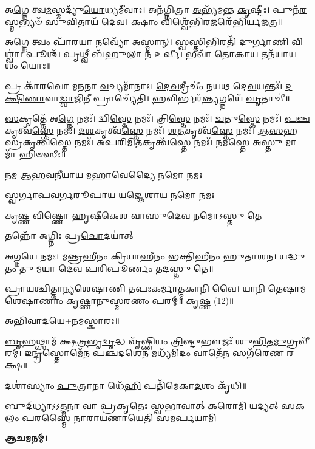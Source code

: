 𑌅\-\ul{𑌗𑍍𑌨𑍇} 𑌤𑍍𑌵\-\ul{𑌮}\-𑌸𑍍𑌮𑌦𑍍𑌯𑍁᳴\-\ul{𑌯𑍋}\-𑌧𑍍𑌯𑌮𑍀᳴𑌵𑌾𑌃। 𑌅𑌨᳴𑌗𑍍𑌨𑌿𑌤𑍍𑌰𑌾 \ul{𑌅}\-𑌭𑍍𑌯᳴𑌮𑌨𑍍𑌤 \ul{𑌕𑍃}\-𑌷𑍍𑌟𑍀𑌃।
𑌪𑍁𑌨᳴\-\ul{𑌰}\-𑌸𑍍𑌮𑌭𑍍𑌯𑍞᳴ 𑌸𑍁\-\ul{𑌵𑌿}\-𑌤𑌾𑌯᳴ 𑌦𑍇𑌵। 𑌕𑍍𑌷𑌾𑌂 𑌵𑌿𑌶𑍍𑌵𑍇᳴𑌭𑌿\-\ul{𑌰}\-𑌜𑌰𑍇᳴𑌭𑌿𑌰𑍍𑌯𑌜𑌤𑍍𑌰॥ 

𑌅\-\ul{𑌗𑍍𑌨𑍇} 𑌤𑍍𑌵𑌂 𑌪𑌾᳴𑌰\-\ul{𑌯𑌾} 𑌨𑌵𑍍𑌯𑍋᳴ \ul{𑌅}\-𑌸𑍍𑌮𑌾𑌨𑍍। \ul{𑌸𑍍𑌵}\-𑌸𑍍𑌤𑌿\-\ul{𑌭𑌿}\-𑌰𑌤𑌿᳴ \ul{𑌦𑍁}\-𑌰𑍍𑌗𑌾\-\ul{𑌣𑌿} 𑌵𑌿𑌶𑍍𑌵𑌾॑।
𑌪𑍂𑌶𑍍𑌚᳴ \ul{𑌪𑍃}\-𑌥𑍍𑌵𑍀 𑌬᳴\-\ul{𑌹𑍁}\-𑌲𑌾 𑌨᳴ \ul{𑌉}\-𑌰𑍍𑌵𑍀। 𑌭𑌵𑌾᳴ \ul{𑌤𑍋}\-𑌕𑌾\-\ul{𑌯} 𑌤𑌨᳴𑌯𑌾\-\ul{𑌯} 𑌶𑌂 𑌯𑍋𑌃॥

𑌪𑍍𑌰 𑌕𑌾᳴𑌰𑌵𑍋 𑌮\-\ul{𑌨}\-𑌨𑌾 \ul{𑌵}\-𑌚𑍍𑌯𑌮𑌾᳴𑌨𑌾𑌃। \ul{𑌦𑍇}\-\-\ul{𑌵}\-𑌦𑍍𑌰𑍀𑌚𑍀𑌂॑ 𑌨𑌯𑌥 𑌦𑍇\-\ul{𑌵}\-𑌯𑌨𑍍𑌤𑌃᳴।
\-\ul{𑌦}\-\-\ul{𑌕𑍍𑌷𑌿}\-\-\ul{𑌣𑌾}\-𑌵𑌾\-\ul{𑌡𑍍𑌵𑌾}\-𑌜𑌿\-\ul{𑌨𑍀} 𑌪𑍍𑌰𑌾𑌚𑍍𑌯𑍇᳴𑌤𑌿। \ul{𑌹}\-𑌵𑌿𑌰𑍍𑌭𑌰᳴\-\ul{𑌨𑍍𑌤𑍍𑌯}\-𑌗𑍍𑌨𑌯𑍇᳴ \ul{𑌘𑍃}\-𑌤𑌾𑌚𑍀॑॥

\-\ul{𑌸}\-𑌕𑍃𑌤𑍍𑌤𑍇᳴ 𑌅\-\ul{𑌗𑍍𑌨𑍇} 𑌨𑌮𑌃᳴। 𑌦𑍍𑌵𑌿\-\ul{𑌸𑍍𑌤𑍇} 𑌨𑌮𑌃᳴। 𑌤𑍍𑌰𑌿\-\ul{𑌸𑍍𑌤𑍇} 𑌨𑌮𑌃᳴। \ul{𑌚}\-𑌤𑍁\-\ul{𑌸𑍍𑌤𑍇} 𑌨𑌮𑌃᳴। \ul{𑌪}\-\-\ul{𑌞𑍍𑌚}\-𑌕𑍃𑌤𑍍𑌵᳴\-\ul{𑌸𑍍𑌤𑍇} 𑌨𑌮𑌃᳴। \ul{𑌦}\-\-\ul{𑌶}\-𑌕𑍃𑌤𑍍𑌵᳴\-\ul{𑌸𑍍𑌤𑍇} 𑌨𑌮𑌃᳴। \ul{𑌶}\-\-\ul{𑌤}\-𑌕𑍃𑌤𑍍𑌵᳴\-\ul{𑌸𑍍𑌤𑍇} 𑌨𑌮𑌃᳴। \ul{𑌆}\-\-\ul{𑌸}\-\-\ul{𑌹}\-\-\ul{𑌸𑍍𑌰}\-𑌕𑍃𑌤𑍍𑌵᳴\-\ul{𑌸𑍍𑌤𑍇} 𑌨𑌮𑌃᳴। \ul{𑌅}\-\-\ul{𑌪}\-\-\ul{𑌰𑌿}\-\-\ul{𑌮𑌿}\-\-\ul{𑌤}\-𑌕𑍃𑌤𑍍𑌵᳴\-\ul{𑌸𑍍𑌤𑍇} 𑌨𑌮𑌃᳴। 𑌨𑌮᳴𑌸𑍍𑌤𑍇 𑌅\-\ul{𑌸𑍍𑌤𑍁} 𑌮𑌾 𑌮𑌾᳴ 𑌹𑌿𑍞𑌸𑍀𑌃॥

{𑌨𑌮 𑌆𑌹𑌵𑌨𑍀𑌯𑌾𑌯 𑌮𑌹𑌾𑌵𑍇𑌦𑍍𑌯𑍈 𑌨𑌮𑍋 𑌨𑌮𑌃}

{𑌸𑍍𑌵𑌰𑍍𑌗𑌾𑌪𑌵𑌰𑍍𑌗𑌰𑍂𑌪𑌾𑌯 𑌯𑌜𑍍𑌞𑍇𑌶𑌾𑌯 𑌨𑌮𑍋 𑌨𑌮𑌃}

{𑌕𑍃𑌷𑍍𑌣 𑌵𑌿𑌷𑍍𑌣𑍋 𑌹𑍃𑌷𑍀𑌕𑍇𑌶 𑌵𑌾𑌸𑍁𑌦𑍇𑌵 𑌨𑌮𑍋𑌽𑌸𑍍𑌤𑍁 𑌤𑍇}

{𑌤𑌨𑍍𑌨𑍋᳴ 𑌅𑌗𑍍𑌨𑌿𑌃 𑌪𑍍𑌰\-\ul{𑌚𑍋}\-𑌦𑌯𑌾॑𑌤𑍍}

𑌅𑌗𑍍𑌨𑌯𑍇 𑌨𑌮𑌃। 𑌮𑌨𑍍𑌤𑍍𑌰𑌹𑍀𑌨𑌂 𑌕𑍍𑌰𑌿𑌯𑌾𑌹𑍀𑌨𑌂 𑌭𑌕𑍍𑌤𑌿𑌹𑍀𑌨𑌂 𑌹𑍁𑌤𑌾𑌶𑌨।
𑌯𑌦𑍍𑌧𑍁𑌤𑌂 𑌤𑍁 𑌮𑌯𑌾 𑌦𑍇𑌵 𑌪𑌰𑌿𑌪𑍂𑌰𑍍𑌣𑌂 𑌤𑌦𑌸𑍍𑌤𑍁 𑌤𑍇॥

𑌪𑍍𑌰𑌾𑌯𑌶𑍍𑌚𑌿𑌤𑍍𑌤𑌾𑌨𑍍𑌯𑌶𑍇𑌷𑌾𑌣𑌿 𑌤𑌪𑌃𑌕𑌰𑍍𑌮𑌾𑌤𑍍𑌮𑌕𑌾𑌨𑌿 𑌵𑍈।
𑌯𑌾𑌨𑌿 𑌤𑍇𑌷𑌾𑌮𑌶𑍇𑌷𑌾𑌣𑌾𑌂 𑌕𑍃𑌷𑍍𑌣𑌾𑌨𑍁𑌸𑍍𑌮𑌰𑌣𑌂 𑌪𑌰𑌮𑍍॥ 𑌕𑍃𑌷𑍍𑌣 (12)॥

𑌅𑌭𑌿𑌵𑌾𑌦𑌯𑍇+𑌨𑌮𑌸𑍍𑌕𑌾𑌰𑌃॥

\-\ul{𑌬𑍃}\-𑌹𑌥𑍍𑌸𑌾𑌮᳴ 𑌕𑍍𑌷\-\ul{𑌤𑍍𑌰}\-𑌭𑍃\-\ul{𑌦𑍍𑌵𑍃}\-𑌦𑍍𑌧 𑌵𑍃᳴𑌷𑍍𑌣𑌿𑌯𑌂 \ul{𑌤𑍍𑌰𑌿}\-𑌷𑍍𑌟𑍁𑌭𑍗𑌜𑌃᳴ 𑌶𑍁\-\ul{𑌭𑌿}\-𑌤\-\ul{𑌮𑍁}\-𑌗𑍍𑌰𑌵𑍀᳴𑌰𑌮𑍍।
𑌇\-\ul{𑌨𑍍𑌦𑍍𑌰}\-𑌸𑍍𑌤𑍋𑌮𑍇᳴𑌨 𑌪𑌞𑍍𑌚\-\ul{𑌦}\-𑌶𑍇\-\ul{𑌨} 𑌮𑌧𑍍𑌯᳴\-\ul{𑌮𑌿}\-𑌦𑌂 𑌵𑌾𑌤𑍇᳴\-\ul{𑌨} 𑌸𑌗᳴𑌰𑍇𑌣 𑌰𑌕𑍍𑌷॥

𑌦𑌶𑌾॑𑌸𑍍𑌯𑌾𑌂 \ul{𑌪𑍁}\-𑌤𑍍𑌰𑌾𑌨𑌾 𑌧𑍇᳴\-\ul{𑌹𑌿} 𑌪𑌤𑌿᳴𑌮𑍇𑌕𑌾\-\ul{𑌦}\-𑌶𑌂 𑌕𑍃᳴𑌧𑌿॥

{𑌬𑍁𑌦𑍍‌𑌧𑍍𑌯𑌾𑌽𑌽𑌤𑍍𑌮𑌨𑌾 𑌵𑌾 𑌪𑍍𑌰𑌕𑍃𑌤𑍇𑌃 𑌸𑍍𑌵𑌭𑌾𑌵𑌾𑌤𑍍}
{𑌕𑌰𑍋𑌮𑌿 𑌯𑌦𑍍𑌯𑌤𑍍 𑌸𑌕𑌲𑌂 𑌪𑌰𑌸𑍍𑌮𑍈}
{𑌨𑌾𑌰𑌾𑌯𑌣𑌾𑌯𑍇𑌤𑌿 𑌸𑌮𑌰𑍍𑌪𑌯𑌾𑌮𑌿}

\textbf{𑌆𑌚𑌮𑌨𑌮𑍍।}
